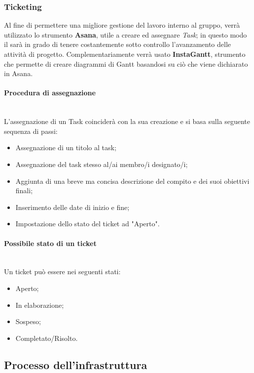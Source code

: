 \subsubsection{Ticketing}
Al fine di permettere una migliore gestione del lavoro interno al gruppo, verrà utilizzato lo strumento \textbf{Asana}, utile a creare ed assegnare \emph{Task}; in questo modo il \RdP  sarà in grado di tenere costantemente sotto controllo l'avanzamento delle attività di progetto. Complementariamente verrà usato \textbf{InstaGantt}, strumento che permette di creare diagrammi di Gantt basandosi su ciò che viene dichiarato in Asana.
\paragraph{Procedura di assegnazione}
~\\L'assegnazione di un Task coinciderà con la sua creazione e si basa sulla seguente sequenza di passi:
\begin{itemize}
\item Assegnazione di un titolo al task;
\item Assegnazione del task stesso al/ai membro/i designato/i;
\item Aggiunta di una breve ma concisa descrizione del compito e dei suoi obiettivi finali;
\item Inserimento delle date di inizio e fine;
\item Impostazione dello stato del ticket ad "Aperto".
\end{itemize}

\paragraph{Possibile stato di un ticket}
~\\Un ticket può essere nei seguenti stati:
\begin{itemize}
\item Aperto;
\item In elaborazione;
\item Sospeso;
\item Completato/Risolto.
\end{itemize}




\subsection{Processo dell'infrastruttura}

